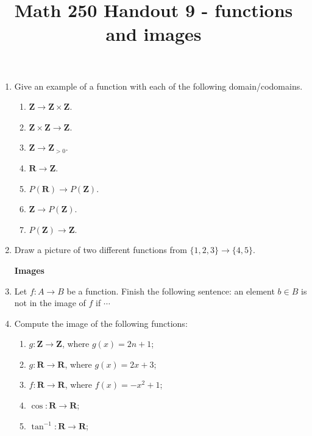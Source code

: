 \documentclass[12pt, reqno]{amsart}
\begin{document}
\title[Math 250 Handout 9 - functions and images]{Math 250 Handout 9  - functions and images}\maketitle

\begin{enumerate}
\item Give an example of a function with each of the following
  domain/codomains.
  \begin{enumerate}
  \item $\mathbf{Z} \to \mathbf{Z} \times \mathbf{Z}$.
  \item $\mathbf{Z} \times \mathbf{Z} \to \mathbf{Z}$.
  \item $\mathbf{Z} \to \mathbf{Z}_{>0}$.
  \item $\mathbf{R} \to \mathbf{Z}$.
  \item $P(\mathbf{R}) \to P(\mathbf{Z})$.
  \item $\mathbf{Z} \to P(\mathbf{Z})$.
  \item $P(\mathbf{Z}) \to \mathbf{Z}$.
  \end{enumerate}
  \vspace{11cm}


\item Draw a picture of two different functions from $\{1,2,3\} \to \{4,5\}$.


\newpage 

\begin{center}
  \textbf{Images}
\end{center}




\item Let $f\colon A \to B$ be a function. Finish the following
  sentence: an element $b \in B$ is not in the image of $f$ if
  $\cdots$\\\vspace{2cm}


\item Compute the image of the following functions:
  \begin{enumerate}

  \item $g \colon \mathbf{Z} \to \mathbf{Z}$, where $g(x) = 2n + 1$;
  \item $g \colon \mathbf{R} \to \mathbf{R}$, where $g(x) = 2x + 3$;
  \item $f \colon \mathbf{R} \to \mathbf{R}$, where $f(x) = -x^2 + 1$;
  \item $\cos \colon \mathbf{R} \to \mathbf{R}$;
  \item $\tan^{-1} \colon \mathbf{R} \to \mathbf{R}$;
  \end{enumerate}
\vspace{1in}







\end{enumerate}
\end{document}

